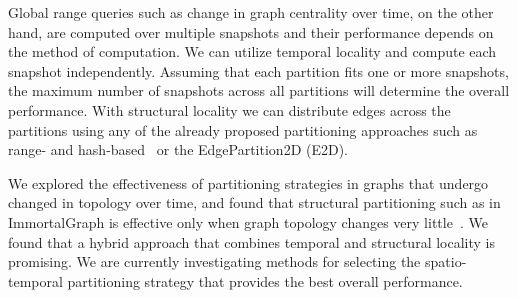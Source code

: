 Global range queries such as change in graph centrality over time, on
the other hand, are computed over multiple snapshots and their
performance depends on the method of computation.  We can utilize
temporal locality and compute each snapshot independently.  Assuming
that each partition fits one or more snapshots, the maximum number of
snapshots across all partitions will determine the overall
performance.  With structural locality we can distribute edges across
the partitions using any of the already proposed partitioning
approaches such as range- and hash-based~\cite{Seo2013} or the
EdgePartition2D (E2D).  

We explored the effectiveness of partitioning strategies in graphs
that undergo changed in topology over time, and found that structural
partitioning such as in ImmortalGraph is effective only when graph
topology changes very little~\cite{MoffittTempWeb16}.  We found that a
hybrid approach that combines temporal and structural locality is
promising.    We
are currently investigating methods for selecting the spatio-temporal
partitioning strategy that provides the best overall performance.

